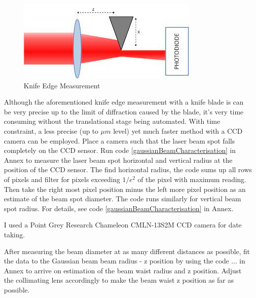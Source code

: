 \documentclass[12pt]{report}
\begin{document}
\begin{figure}[H]
    \centering
    \includegraphics[width=.6\textwidth]{knifeEdgeMeasurement.jpeg}
    \caption{Knife Edge Measurement}
    \label{fig:knifeEdgeMeasurement}
\end{figure}

Although the aforementioned knife edge measurement with a knife blade is can be very precise up to the limit of diffraction caused by the blade, it's very time consuming without the translational stage being automated. With time constraint, a less precise (up to $\mu m$ level) yet much faster method with a CCD camera can be employed. Place a camera such that the laser beam spot falls completely on the CCD sensor. Run code \ref{gaussianBeamCharacterisation} in Annex to measure the laser beam spot horizontal and vertical radius at the position of the CCD sensor. The find horizontal radius, the code sums up all rows of pixels and filter for pixels exceeding $1/e^2$ of the pixel with maximum reading. Then take the right most pixel position minus the left more pixel position as an estimate of the beam spot diameter. The code runs similarly for vertical beam spot radius. For details, see code \ref{gaussianBeamCharacterisation} in Annex. 
\par
I used a Point Grey Research Chameleon CMLN-13S2M CCD camera for date taking. 
\par 
After measuring the beam diameter at as many different distances as possible, fit the data to the Gaussian beam beam radius - z position by using the code ... in Annex to arrive on estimation of the beam waist radius and z position. Adjust the collimating lens accordingly to make the beam waist z position as far as possible. 
\end{document}
